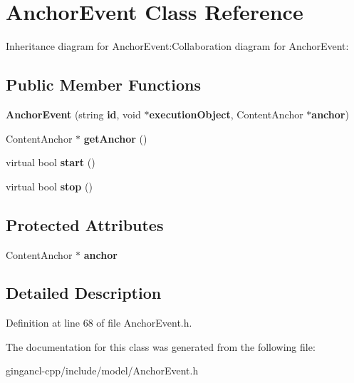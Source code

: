 \section{AnchorEvent Class Reference}
\label{classbr_1_1pucrio_1_1telemidia_1_1ginga_1_1ncl_1_1model_1_1event_1_1AnchorEvent}
Inheritance diagram for AnchorEvent:Collaboration diagram for AnchorEvent:\subsection*{Public Member Functions}
\begin{CompactItemize}
\item 
\textbf{AnchorEvent} (string {\bf id}, void $\ast${\bf executionObject}, ContentAnchor $\ast${\bf anchor})\label{classbr_1_1pucrio_1_1telemidia_1_1ginga_1_1ncl_1_1model_1_1event_1_1AnchorEvent_98153ddb2e985b1fbad41447774009d0}

\item 
ContentAnchor $\ast$ \textbf{getAnchor} ()\label{classbr_1_1pucrio_1_1telemidia_1_1ginga_1_1ncl_1_1model_1_1event_1_1AnchorEvent_4eb3ecb3498332d3ddb26895d3ee888a}

\item 
virtual bool {\bf start} ()\label{classbr_1_1pucrio_1_1telemidia_1_1ginga_1_1ncl_1_1model_1_1event_1_1AnchorEvent_2a1dbe283ac44900c920f3f79339f9f6}

\item 
virtual bool {\bf stop} ()\label{classbr_1_1pucrio_1_1telemidia_1_1ginga_1_1ncl_1_1model_1_1event_1_1AnchorEvent_3d0f1501fa4ccfb9e3f868ab4a185856}

\end{CompactItemize}
\subsection*{Protected Attributes}
\begin{CompactItemize}
\item 
ContentAnchor $\ast$ {\bf anchor}\label{classbr_1_1pucrio_1_1telemidia_1_1ginga_1_1ncl_1_1model_1_1event_1_1AnchorEvent_264bc2730b7adcc1544776484265fe2a}

\end{CompactItemize}


\subsection{Detailed Description}




Definition at line 68 of file AnchorEvent.h.

The documentation for this class was generated from the following file:\begin{CompactItemize}
\item 
gingancl-cpp/include/model/AnchorEvent.h\end{CompactItemize}
